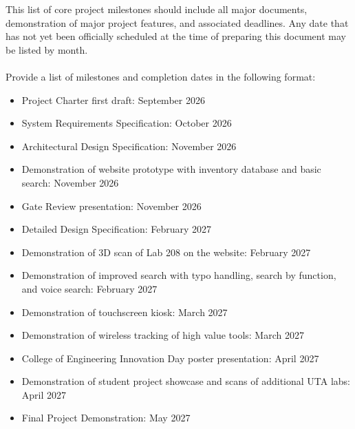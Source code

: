 This list of core project milestones should include all major documents, demonstration of major project features, and associated deadlines. Any date that has not yet been officially scheduled at the time of preparing this document may be listed by month.
\\
\\
Provide a list of milestones and completion dates in the following format:

\begin{itemize}
    \item Project Charter first draft: September 2026
    \item System Requirements Specification: October 2026
    \item Architectural Design Specification: November 2026
    \item Demonstration of website prototype with inventory database and basic search: November 2026
    \item Gate Review presentation: November 2026
    \item Detailed Design Specification: February 2027
    \item Demonstration of 3D scan of Lab 208 on the website: February 2027
    \item Demonstration of improved search with typo handling, search by function, and voice search: February 2027
    \item Demonstration of touchscreen kiosk: March 2027
    \item Demonstration of wireless tracking of high value tools: March 2027
    \item College of Engineering Innovation Day poster presentation: April 2027
    \item Demonstration of student project showcase and scans of additional UTA labs: April 2027
    \item Final Project Demonstration: May 2027
\end{itemize}
